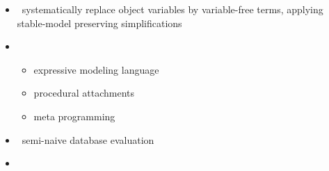 \begin{frame}{\gringo}
  \begin{itemize}
  \item {} \ systematically replace object variables by variable-free terms,
    applying stable-model preserving simplifications
  \item {}
    \begin{itemize}
    \item expressive modeling language
    \item procedural attachments
    \item meta programming
    \end{itemize}
  \item {} \  semi-naive database evaluation
  \item {} \ \cite{kamsch21a}
  \end{itemize}
\end{frame}
%
